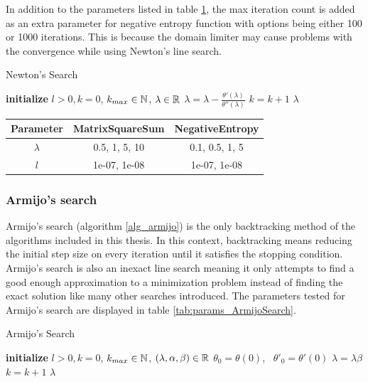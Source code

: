 \documentclass[english, 12pt, a4paper, sci, utf8, a-1b, online, table]{aaltothesis}
\newcommand{\abs}[1]{\ensuremath|#1|}
\newcommand{\R}{\ensuremath\mathbb{R}}
\newcommand{\N}{\ensuremath\mathbb{N}}
\begin{document}
In addition to the parameters listed in table \ref{tab:params_NewtonsSearch}, the max iteration count is added as an extra parameter for negative entropy function with options being either 100 or 1000 iterations. This is because the domain limiter may cause problems with the convergence while using Newton's line search.

\begin{algorithm}[H]
\caption{Newton's Search}
\label{alg_newtons_search}
\begin{algorithmic}[1]
\STATE \textbf{initialize} $l > 0, k = 0$, $k_{max} \in \N$, $\lambda \in \R$
\WHILE{$\abs{\theta'(\lambda)} > l$ \AND $k < k_{max}$}
    \STATE $\lambda = \lambda -\frac{\theta'(\lambda)}{\theta''(\lambda)}$
    \STATE $k = k + 1$
\ENDWHILE
\RETURN $\lambda$
\end{algorithmic}
\end{algorithm}

\begin{table}[H]
\label{tab:params_NewtonsSearch}
\centering
{}
\begin{tabular}{|c|c|c|}
\hline
\rowcolor{gray!25}
Parameter & MatrixSquareSum & NegativeEntropy \\
\hline
$\lambda$ & 0.5, 1, 5, 10 & 0.1, 0.5, 1, 5 \\
$l$ & 1e-07, 1e-08 & 1e-07, 1e-08 \\
\hline
\end{tabular}
\end{table}


\subsubsection{Armijo's search}


Armijo's search (algorithm \ref{alg_armijo}) is the only backtracking method of the algorithms included in this thesis. In this context, backtracking means reducing the initial step size on every iteration until it satisfies the stopping condition. Armijo's search is also an inexact line search meaning it only attempts to find a good enough approximation to a minimization problem instead of finding the exact solution like many other searches introduced. The parameters tested for Armijo's search are displayed in table \ref{tab:params_ArmijoSearch}. \cite{book:convex_optimization}


\begin{algorithm}[H]
\caption{Armijo's Search}
\label{alg_armijo}
\begin{algorithmic}[1]
\STATE \textbf{initialize} $l > 0, k = 0$, $k_{max} \in \N$, $(\lambda, \alpha, \beta) \in \R$
\STATE $\theta_0 = \theta(0)$, \ $\theta'_0 = \theta'(0)$
    \STATE $\lambda = \lambda \beta$
    \STATE $k = k + 1$
\ENDWHILE
\RETURN $\lambda$
\end{algorithmic}
\end{algorithm}
\end{document}
